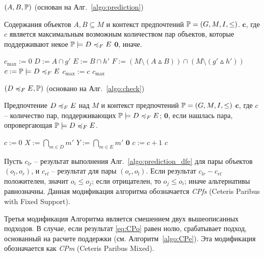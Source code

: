	\begin{algorithm}
		\caption{$(A, B, \mathbb{P})$ (основан на Алг.~\ref{algo:prediction})}
		\label{algo:prediction_dfe}
		\begin{algorithmic}[1]
			\REQUIRE Содержания объектов $A, B \subseteq M$ и контекст предпочтений $\mathbb{P} = (G, M, I, \leq)$.
			\ENSURE $\mathbf{c}$, где $c$ является максимальным возможным количеством пар объектов, которые поддерживают некое $\mathbb{P} \models D \preccurlyeq_{F} E$  $\mathbf{0}$, иначе.
			\item[]
			\STATE $c_{\text{max}} := 0$
			\STATE $D := A \cap g'$
			\STATE $E := B \cap h'$
			\STATE $F := (M \setminus (A \vartriangle B)) \cap (M \setminus (g' \vartriangle h'))$
			\STATE $c := \mathbb{P} \models D \preccurlyeq_{F} E$
			\STATE $c_{\text{max}} := c$
			\ENDIF
			\ENDFOR
			\ENDFOR
			\RETURN $c_{\text{max}}$
		\end{algorithmic}
	\end{algorithm}

	\begin{algorithm}
		\caption{$(D \preccurlyeq_{F} E, \mathbb{P})$ (основано на Алг.~\ref{algo:check})}
		\label{algo:check_dfe}
		\begin{algorithmic}[1]
			\REQUIRE Предпочтение $D \preccurlyeq_{F} E$ над $M$ и контекст предпочтений $\mathbb{P} = (G, M, I, \leq)$
			\ENSURE $\mathbf{c}$, где $c$ – количество пар, поддерживающих $\mathbb{P} \models D \preccurlyeq_{F} E$; $\mathbf{0}$, если нашлась пара, опровергающая $\mathbb{P} \models D \preccurlyeq_{F} E$.
			\item[]
			\STATE $c := 0$
			\STATE $X := \bigcap_{m \in D}m'$
			\STATE $Y := \bigcap_{m \in E}m'$
			\FORALL{$g \in X$}
			\FORALL{$h \in Y$}
			\IF {$g' \cap {F} = h' \cap {F}$}
			\IF {$g \not\leq h$}
			\RETURN $\mathbf{0}$
			\ELSE 
			\STATE $c := c + 1$
			\ENDIF
			\ENDIF
			\ENDFOR
			\ENDFOR
			\RETURN $c$
		\end{algorithmic}
	\end{algorithm}
	
	\noindent Пусть $c_{lr}$ – результат выполнения Алг.~\ref{algo:prediction_dfe} для пары объектов $(o_l, o_r)$, и $c_{rl}$ – результат для пары $(o_r, o_l)$.
	Если результат $c_{lr} - c_{rl}$ положителен, значит $o_i \leq o_j$; если отрицателен, то $o_j \leq o_i$; иначе альтернативы равнозначны. Данная модификация алгоритма обозначается \emph{CPfs} (Ceteris Paribus with Fixed Support).
	
	Третья модификация Алгоритма является смешением двух вышеописанных подходов. В случае, если результат \ref{eq:CPo} равен нолю, срабатывает подход, основанный на расчете поддержки (см. Алгоритм~\ref{algo:CPe}). Эта модификация обозначается как \emph{CPm} (Ceteris Paribus Mixed).
	
